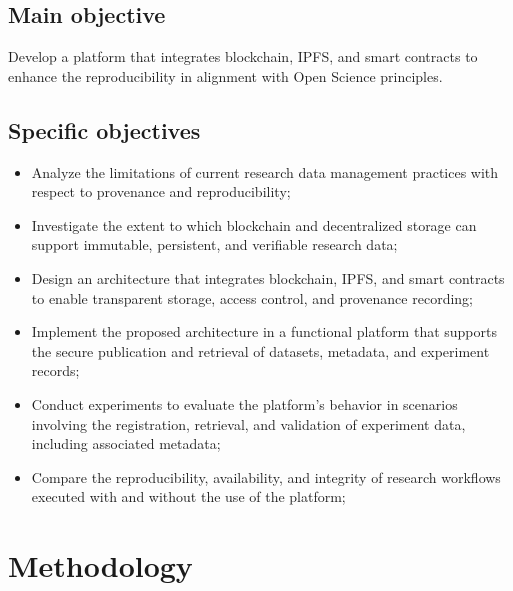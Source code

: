 \documentclass[final]{rc-book-2.14}
\begin{document}
\subsection{Main objective}

\begin{citeverbatim}

Develop a platform that integrates blockchain, IPFS, and smart contracts to enhance the reproducibility in alignment with Open Science principles.

\end{citeverbatim}

\subsection{Specific objectives}

\begin{itemize}
    \item Analyze the limitations of current research data management practices with respect to provenance and reproducibility;
    
    \item Investigate the extent to which blockchain and decentralized storage can support immutable, persistent, and verifiable research data;

    \item Design an architecture that integrates blockchain, IPFS, and smart contracts to enable transparent storage, access control, and provenance recording;

    \item Implement the proposed architecture in a functional platform that supports the secure publication and retrieval of datasets, metadata, and experiment records;

    \item Conduct experiments to evaluate the platform’s behavior in scenarios involving the registration, retrieval, and validation of experiment data, including associated metadata;

    \item Compare the reproducibility, availability, and integrity of research workflows executed with and without the use of the platform;

\end{itemize}

\section{Methodology}
\label{chp:intro:sec:methodology}
\end{document}
